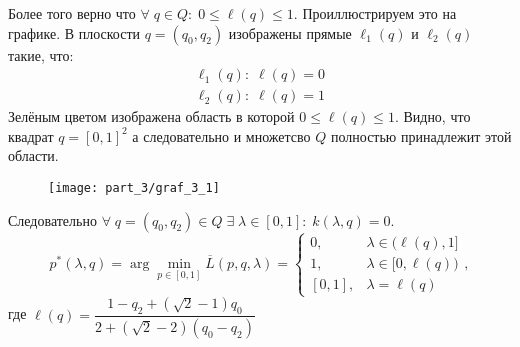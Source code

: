 Более того верно что 
$\forall \; q \in Q: \; 0 \leqslant \ell(q) \leqslant 1$. 
Проиллюстрируем это на графике. В плоскости $q=(q_0,q_2)$ изображены 
прямые $\ell_1(q)$ и $\ell_2(q)$ такие, что:
\begin{gather*}
	\ell_1(q): \; \ell(q)=0 
	\\
	\ell_2(q): \; \ell(q)=1
\end{gather*}
Зелёным цветом изображена область в которой
$0 \leqslant \ell(q) \leqslant 1$.
Видно, что квадрат $q = [0,1]^2$ а следовательно и
множетсво $Q$ полностью принадлежит этой области.
\begin{figure}[H]
	\centering
  	\texttt{[image: part\_3/graf\_3\_1]}
  	\caption{}
\end{figure}

Следовательно $\forall \; q=(q_0, q_2) \in Q \;
\exists \; \lambda \in [0,1]: \; k(\lambda,q)=0$.
$$
	p^*(\lambda,q)=
	\arg \min \limits_{p \in [0, 1]} \overline{L}(p,q,\lambda)=
	\begin{cases}
		0, & \lambda \in \big(\ell (q), 1\big] \\
		1, & \lambda \in \big[0, \ell(q) \big) \\
		[0,1], & \lambda=\ell(q)
	\end{cases},
$$	
где $\ell(q)=\dfrac{1 - q_2 + (\sqrt{2} - 1)q_0}{2+(\sqrt{2}-2)(q_0-q_2)}$